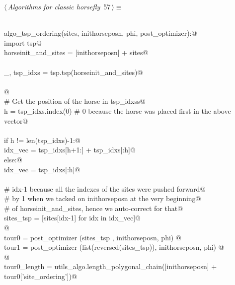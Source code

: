 \documentclass[11.5pt]{report}
\begin{document}
\begin{flushleft} \small\label{scrap79}\raggedright\small
{} $\langle\,${\itshape Algorithms for classic horsefly}\nobreak\ {\footnotesize {57}}$\,\rangle\equiv$
\vspace{-1ex}
\begin{list}{}{} \item
\mbox{}\verb@@\\
\mbox{}\verb@def algo_tsp_ordering(sites, inithorseposn, phi, post_optimizer):@\\
\mbox{}\verb@    import tsp@\\
\mbox{}\verb@    horseinit_and_sites = [inithorseposn] + sites@\\
\mbox{}\verb@@\\
\mbox{}\verb@    _, tsp_idxs = tsp.tsp(horseinit_and_sites)@\\
\mbox{}\verb@@\\
\mbox{}\verb@          @\\
\mbox{}\verb@    # Get the position of the horse in tsp_idxss@\\
\mbox{}\verb@    h = tsp_idxs.index(0) # 0 because the horse was placed first in the above vector@\\
\mbox{}\verb@@\\
\mbox{}\verb@    if h != len(tsp_idxs)-1:@\\
\mbox{}\verb@        idx_vec = tsp_idxs[h+1:] + tsp_idxs[:h]@\\
\mbox{}\verb@    else:@\\
\mbox{}\verb@        idx_vec = tsp_idxs[:h]@\\
\mbox{}\verb@@\\
\mbox{}\verb@    # idx-1 because all the indexes of the sites were pushed forward@\\
\mbox{}\verb@    # by 1 when we tacked on inithorseposn at the very beginning@\\
\mbox{}\verb@    # of horseinit_and_sites, hence we auto-correct for that@\\
\mbox{}\verb@    sites_tsp = [sites[idx-1] for idx in idx_vec]@\\
\mbox{}\verb@    @\\
\mbox{}\verb@    tour0    = post_optimizer (sites_tsp                , inithorseposn, phi) @\\
\mbox{}\verb@    tour1    = post_optimizer (list(reversed(sites_tsp)), inithorseposn, phi) @\\
\mbox{}\verb@    @\\
\mbox{}\verb@    tour0_length = utils_algo.length_polygonal_chain([inithorseposn] + tour0['site_ordering'])@\\

\end{list}
\end{flushleft}
\end{document}
